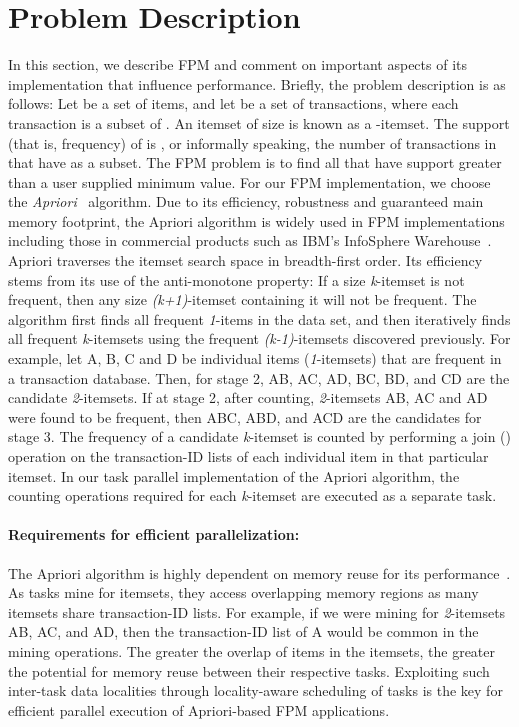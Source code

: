 \documentclass{IOS-Book-Article}
\begin{document}
\section{Problem Description}
\label{sec:problem}
In this section, we describe FPM and comment on important aspects of its
implementation that influence performance.  Briefly, the problem description is
as follows: Let  be a set of  items, and let
  be a set of  transactions, where each
transaction  is a subset of . An itemset  of size
 is known as a -itemset. The support (that is, frequency) of  is
, or informally speaking, the number of
transactions in  that have  as a subset. The FPM problem is to find all
 that have support greater than a user supplied minimum value.  
For our FPM implementation, we choose the \textit{Apriori}~\cite{
Agrawal:1994:Apriori} algorithm.  Due to its efficiency, robustness and
guaranteed main memory footprint, the Apriori algorithm is widely used in FPM
implementations including those in commercial products such as IBM's InfoSphere
Warehouse~\cite{zaki1999}.   Apriori traverses the itemset search space in
breadth-first order.  Its efficiency stems from its use of the anti-monotone
property: If a size \textit{k}-itemset is not frequent, then any size
\textit{(k+1)}-itemset containing it will not be frequent. The algorithm
first finds all frequent \textit{1}-items in the data set, and then
iteratively finds all frequent \textit{k}-itemsets using the frequent
\textit{(k-1)}-itemsets discovered previously. For example, let A, B, C and D
be individual items (\textit{1}-itemsets) that are frequent in a transaction
database. Then, for stage 2, AB, AC, AD, BC, BD, and CD are the candidate
\textit{2}-itemsets. If at stage 2, after counting, \textit{2}-itemsets AB,
AC and AD were found to be frequent, then ABC, ABD, and ACD are the
candidates for stage 3.  The frequency of a candidate \textit{k}-itemset is
counted by performing a join () operation on the transaction-ID
lists of each individual item in that particular itemset. In our task
parallel implementation of the Apriori algorithm, the counting operations
required for each \textit{k}-itemset are executed as a separate task. 

\paragraph{Requirements for efficient parallelization:}
The Apriori algorithm is highly dependent on memory reuse for its
performance~\cite{Ghoting:2007}. As tasks mine for itemsets, they access
overlapping memory regions as many itemsets share transaction-ID lists.  For
example, if we were mining for \textit{2}-itemsets AB, AC, and AD, then the
transaction-ID list of A would be common in the mining operations. The greater
the overlap of items in the itemsets, the greater the potential for memory
reuse between their respective tasks. Exploiting such inter-task data
localities through locality-aware scheduling of tasks is the key for efficient
parallel execution of Apriori-based FPM applications.
\end{document}
